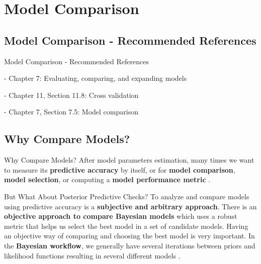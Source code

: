 \section{Model Comparison}

\subsection{Model Comparison - Recommended References}
\begin{frame}{Model Comparison - Recommended References}
	\begin{vfilleditems}
		\item \textcite{gelman2013bayesian} - Chapter 7: Evaluating, comparing, and expanding models
		\item \textcite{gelman2020regression} - Chapter 11, Section 11.8: Cross validation
		\item \textcite{mcelreath2020statistical} - Chapter 7, Section 7.5: Model comparison
		\item \textcite{vehtariPracticalBayesianModel2015}
		\item \textcite{spiegelhalter2002bayesian}
		\item \textcite{van2005dic}
		\item \textcite{watanabe2010asymptotic}
		\item \textcite{gelfand1996model}
		\item \textcite{watanabe2010asymptotic}
		\item \textcite{geisser1979predictive}
	\end{vfilleditems}
\end{frame}

\subsection{Why Compare Models?}
\begin{frame}{Why Compare Models?}
	After model parameters estimation,
	many times we want to measure its \textbf{predictive accuracy} by itself,
	or for \textbf{model comparison}, \textbf{model selection}, or computing a \textbf{model performance metric}
	\parencite{geisser1979predictive}.
\end{frame}

\begin{frame}{But What About Posterior Predictive Checks?}
	To analyze and compare models using predictive accuracy is a
	\textbf{subjective and arbitrary approach}.
	\vfill
	There is an \textbf{objective approach to compare Bayesian models}
	which uses a robust metric that helps us
	select the best model in a set of candidate models.
	\vfill
	Having an objective way of comparing and choosing the best model is very important.
	In the \textbf{Bayesian workflow},
	we generally have several iterations between priors and likelihood functions
	resulting in several different models \parencite{gelmanBayesianWorkflow2020}.
\end{frame}

